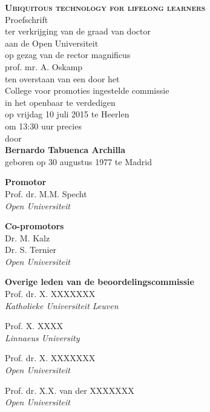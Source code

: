 \documentclass[normalheadings,tablecaptionabove,twoside,openright,chapterprefix,halfparskip,fontsize=10pt,numbers=noenddot]{scrbook} %
\begin{document}
\begin{titlepage}
	\newpage
	\null\vspace*{15.25em}
	\center
	\huge
	\textbf{\textsc{Ubiquitous technology for lifelong learners}}\\
	\vspace{2em}
	\normalsize
	Proefschrift\\
	\vspace{1em}
	ter verkrijging  van de graad van doctor \\
	aan de Open Universiteit \\
	op gezag van de rector magnificus \\
	prof. mr. A. Oskamp \\
	ten overstaan van een door het \\
	College voor promoties ingestelde commissie \\
	in het openbaar te verdedigen\\
	\vspace{1em}
	op vrijdag 10 juli 2015 te Heerlen \\
	om 13:30 uur precies\\
	\vspace{1em}
	door\\
	\vspace{1em}
	\textbf{Bernardo Tabuenca Archilla}\\
	geboren op 30 augustus 1977 te Madrid\\
	\vfill\null
	
	\newpage
	\null\vfill
	\raggedright
	\textbf{Promotor} \\
	Prof. dr. M.M. Specht \\
	\textit{Open Universiteit} \par
	\textbf{Co-promotors} \\
	Dr. M. Kalz \\
	Dr. S. Ternier \\	
	\textit{Open Universiteit} \par
	\textbf{Overige leden van de beoordelingscommissie}\\
	Prof. dr. X. XXXXXXX \\
	\textit{Katholieke Universiteit Leuven} \par
	Prof. X. XXXX \\
	\textit{Linnaeus University}  \par
	Prof. dr. X. XXXXXXX \\
	\textit{Open Universiteit} \par
	Prof. dr. X.X. van der XXXXXXX \\
	\textit{Open Universiteit}

	\newpage
	\null\vspace*{15.25em}
	\begin{quote}
	\end{quote}
	\vfill\null
	\clearpage{\pagestyle{empty}\cleardoublepage}
\end{titlepage}
	
\end{document}
